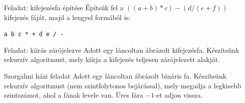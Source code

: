 \documentclass[hungarian]{beamer}
\begin{document}
\begin{frame}[t]{Feladat: kifejezésfa építése}
Építsük fel a $((a+b)*c)-(d/(e+f))$ kifejezés fáját, majd a lengyel formából is:

\texttt{a b c * + d e / -}
\end{frame}

\begin{frame}[t]{Feladat: kiírás zárójelezve}
Adott egy láncoltan ábrázolt kifejezésfa. Készítsünk rekurzív algoritmust, mely kiírja a kifejezés teljesen zárójelezett alakját.
\end{frame}

\begin{frame}[t]{Szorgalmi házi feladat}
Adott egy láncoltan ábrázolt bináris fa. Készítsünk rekurzív algoritmust (nem szintfolytonos bejárással), mely megadja a legkisebb szintszámot, ahol a fának levele van. Üres fára $-1$-et adjon vissza.
\end{frame}
\end{document}
